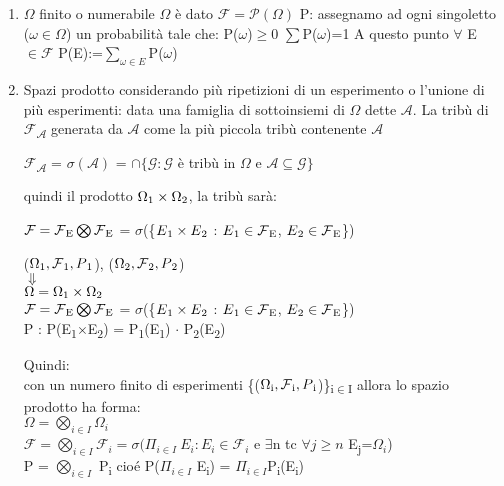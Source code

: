 \documentclass[12pt, a4paper]{article}
\def\SB#1{\textsubscript{#1}}
\begin{document}
\begin{enumerate}
    \item $\Omega$ finito o numerabile
    \subitem $\Omega$ è dato 
    \subitem $\mathcal{F}=\mathcal{P}(\Omega)$
    \subitem P: assegnamo ad ogni singoletto ($\omega\in\Omega$) un probabilità tale che:
    \subsubitem P($\omega$)$\geq$0
    \subsubitem $\sum$P($\omega$)=1
    \subitem A questo punto $\forall$ E $\in\mathcal{F}$ P(E):=$\sum_{\omega\in E}$P($\omega$)
    \item Spazi prodotto
    \subitem considerando più ripetizioni di un esperimento o l'unione di più esperimenti:
    data una famiglia di sottoinsiemi di $\Omega$ dette $\mathcal{A}$. La tribù di $\mathcal{F}$\SB{$\mathcal{A}$}
    generata da $\mathcal{A}$ come la più piccola tribù contenente $\mathcal{A}$
    \begin{center}
        $\mathcal{F}$\SB{$\mathcal{A}$} = $\sigma (\mathcal{A})$ = $\cap \{\mathcal{G} : \mathcal{G}$ è
          tribù in $\Omega$ e $\mathcal{A} \subseteq \mathcal{G}\}$
    \end{center}
    quindi il prodotto $\Omega\SB{1}\times\Omega\SB{2}$, la tribù sarà:
    \begin{center}
        $\mathcal{F}  =  \mathcal{F}\SB{E}\bigotimes\mathcal{F}\SB{E}$ = 
        $\sigma$(\{$E\SB{1}\times E\SB{2}$ : $E\SB{1}\in\mathcal{F}\SB{E}$, $E\SB{2}\in\mathcal{F}\SB{E}$\})


        ($\Omega\SB{1}, \mathcal{F}\SB{1}, P\SB{1}$), ($\Omega\SB{2}, \mathcal{F}\SB{2}, P\SB{2}$)
        \\$\Downarrow$\\
        $\Omega = \Omega\SB{1}\times\Omega\SB{2}$\\
        $\mathcal{F}  =  \mathcal{F}\SB{E}\bigotimes\mathcal{F}\SB{E}$ = 
        $\sigma$(\{$E\SB{1}\times E\SB{2}$ : $E\SB{1}\in\mathcal{F}\SB{E}$, $E\SB{2}\in\mathcal{F}\SB{E}$\})\\
        P : P(E\SB{1}$\times$E\SB{2}) = P\SB{1}(E\SB{1}) $\cdot$ P\SB{2}(E\SB{2})
    \end{center}

    Quindi:\\
    con un numero finito di esperimenti \{($\Omega\SB{i}, \mathcal{F}\SB{i}, P\SB{i}$)\}\SB{i$\in$I}
    allora lo spazio prodotto ha forma:\\
    $\Omega  =  \bigotimes_{i\in I} \Omega_{i}$\\
    $\mathcal{F}  =  \bigotimes_{i\in I} \mathcal{F}_{i}  =  \sigma (\Pi_{i\in I}\ E_{i}: E_{i}\in\mathcal{F}_{i}$ e $\exists$n tc $\forall j\geq n$ E\SB{j}=$\Omega_{i}$)\\
    P = $\bigotimes_{i\in I}$ P\SB{i} cioé P($\Pi_{i\in I}$ E\SB{i}) = $\Pi_{i\in I}$P\SB{i}(E\SB{i})

\end{enumerate}
\end{document}
